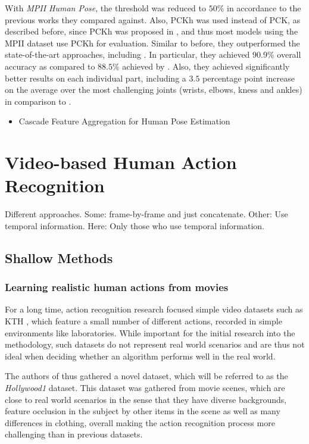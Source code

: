 With \textit{MPII Human Pose}, the threshold was reduced to $50\%$ in accordance to the previous works they compared against.
Also, PCKh was used instead of PCK, as described before, since PCKh was proposed in \cite{andriluka_2d_2014}, and thus most models using the MPII dataset use PCKh for evaluation.
Similar to before, they outperformed the state-of-the-art approaches, including \cite{wei_convolutional_2016}.
In particular, they achieved $90.9\%$ overall accuracy as compared to $88.5\%$ achieved by \cite{wei_convolutional_2016}.
Also, they achieved significantly better results on each individual part, including a $3.5$ percentage point increase on the average over the most challenging joints (wrists, elbows, kness and ankles) in comparison to \cite{wei_convolutional_2016}. 

\begin{itemize}
    \item Cascade Feature Aggregation for Human Pose Estimation \cite{su_cascade_2019}
\end{itemize}

\section{Video-based Human Action Recognition}

Different approaches.
Some: frame-by-frame and just concatenate.
Other: Use temporal information.
Here: Only those who use temporal information.

\subsection{Shallow Methods}
\label{sec:har_shallow}
\subsubsection{Learning realistic human actions from movies}
\label{sec:laptev-shallow}

For a long time, action recognition research focused simple video datasets such as KTH \cite{schuldt_recognizing_2004}, which feature a small number of different actions, recorded in simple environments like laboratories.
While important for the initial research into the methodology, such datasets do not represent real world scenarios and are thus not ideal when deciding whether an algorithm performs well in the real world.

The authors of \cite{laptev_learning_2008} thus gathered a novel dataset, which will be referred to as the \textit{Hollywood1} dataset.
This dataset was gathered from movie scenes, which are close to real world scenarios in the sense that they have diverse backgrounds, feature occlusion in the subject by other items in the scene as well as many differences in clothing, overall making the action recognition process more challenging than in previous datasets.

